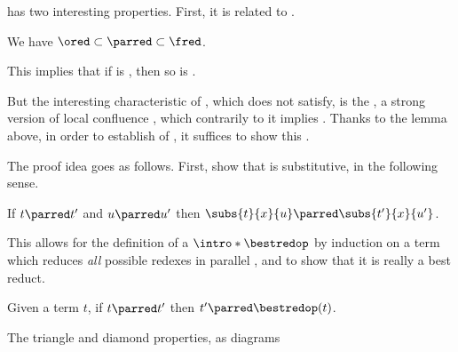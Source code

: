  has two interesting properties. First, it
is related to .

\begin{lemma}
  We have $\ored \subset \mathord{\parred} \subset \mathord{\fred}$.

  This implies that if  is , then so is .
\end{lemma}

\AP But the interesting characteristic of , which 
does not satisfy, is the
, a strong version of local confluence%
,
which contrarily to it implies . Thanks to the lemma above,
in order to establish  of 
, it suffices to show this .

The proof idea goes as follows. First, show that  is substitutive, in
the following sense.
\begin{lemma}
  If $t \parred t'$ and $u \parred u'$ then
  $\subs{t}{x}{u} \parred \subs{t'}{x}{u'}$.
\end{lemma}
\AP This allows for the definition of a  $\intro*\bestredop$ by induction
on a term which reduces \emph{all} possible redexes in parallel%
,
and to show that it is really a best reduct.
\begin{lemma}
  Given a term $t$, if $t \parred t'$ then $t' \parred \bestred{t}$.
\end{lemma}

\begin{marginfigure}
  \centering 

  \caption{The triangle and diamond properties, as diagrams}
\end{marginfigure}

